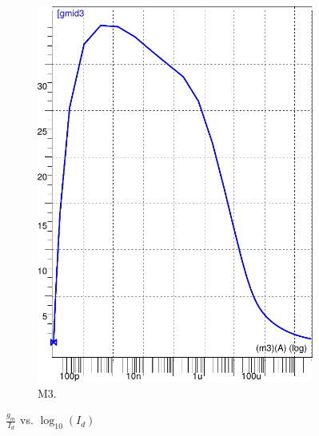 \begin{figure}[!tbp]
\begin{subfigure}[b]{0.355\textwidth}
   \includegraphics[width=\textwidth]{images/gmid_log10id_m3}
   \caption{M3.}
   \label{fig:f2}
   \end{subfigure}
    \caption{$\frac{g_m}{I_d}$ vs. $\log_{10}(I_d)$}
\end{figure}






